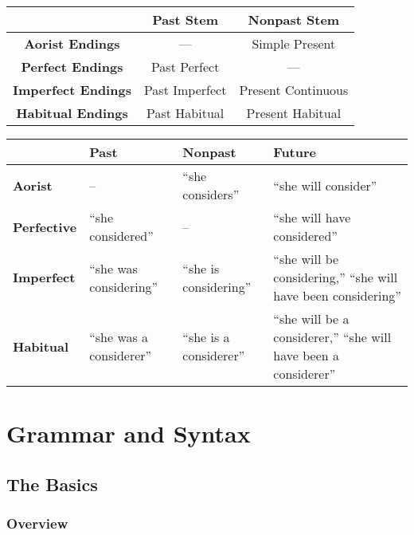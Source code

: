 \documentclass[oneside]{book}
\begin{document}
\begin{center}
\begin{tabular}{c | c c} \\
& \textbf{Past Stem} & \textbf{Nonpast Stem} \\
\hline
\textbf{Aorist Endings} & --- & Simple Present\\
\textbf{Perfect Endings} & Past Perfect & --- \\
\textbf{Imperfect Endings} &  Past Imperfect & Present Continuous\\
\textbf{Habitual Endings} & Past Habitual & Present Habitual

\end{tabular}
\end{center}





\smallskip

\begin{center}
\begin{tabular}{p{2cm} || p{4cm} p{4cm} p{4.5cm}}
  & \textbf{Past} & \textbf{Nonpast} & \textbf{Future}\\
  \hline
  \hline
  \textbf{Aorist} & -- & ``she considers'' & ``she will consider'' \\
  \hline
  \textbf{Perfective}  & ``she considered'' & -- & ``she will have considered'' \\
  \hline
  \textbf{Imperfect} & ``she was considering'' & ``she is considering'' & {``she will be considering,'' ``she will have been considering''}\\
  \hline
  \textbf{Habitual} & ``she was a considerer'' & ``she is a considerer'' & ``she will be a considerer,'' ``she will have been a considerer''


\end{tabular}

\end{center}


\newpage
\part{Grammar and Syntax}

\chapter{The Basics}
\section{Overview}
\end{document}
